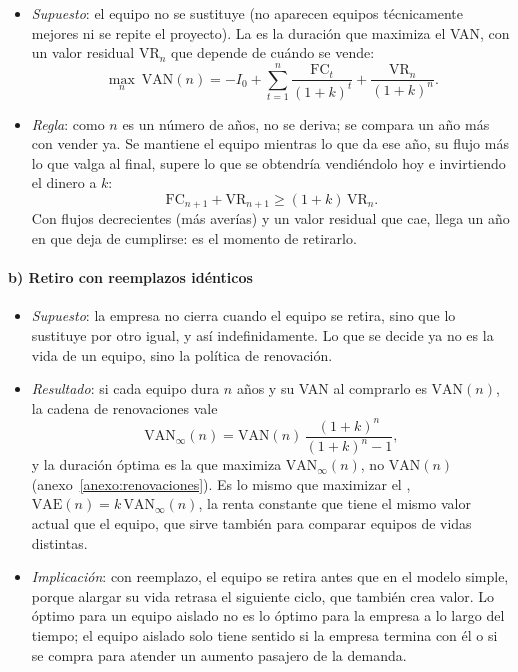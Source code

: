 \documentclass[11pt]{article}
\begin{document}
\begin{itemize}
\item \emph{Supuesto}: el equipo no se sustituye (no aparecen equipos técnicamente mejores ni se repite el proyecto). La  es la duración que maximiza el VAN, con un valor residual $\mathrm{VR}_n$ que depende de cuándo se vende:
  \[
  \max_{n}\ \mathrm{VAN}(n)=-I_0+\sum_{t=1}^{n}\frac{\mathrm{FC}_t}{(1+k)^t}+\frac{\mathrm{VR}_n}{(1+k)^n}.
  \]
\item \emph{Regla}: como $n$ es un número de años, no se deriva; se compara un año más con vender ya. Se mantiene el equipo mientras lo que da ese año, su flujo más lo que valga al final, supere lo que se obtendría vendiéndolo hoy e invirtiendo el dinero a $k$:
  \[
  \mathrm{FC}_{n+1}+\mathrm{VR}_{n+1}\geq(1+k)\,\mathrm{VR}_n.
  \]
  Con flujos decrecientes (más averías) y un valor residual que cae, llega un año en que deja de cumplirse: es el momento de retirarlo.
\end{itemize}

\paragraph{b) Retiro con reemplazos idénticos}

\begin{itemize}
\item \emph{Supuesto}: la empresa no cierra cuando el equipo se retira, sino que lo sustituye por otro igual, y así indefinidamente. Lo que se decide ya no es la vida de un equipo, sino la política de renovación.
\item \emph{Resultado}: si cada equipo dura $n$ años y su VAN al comprarlo es $\mathrm{VAN}(n)$, la cadena de renovaciones vale
  \[
  \mathrm{VAN}_\infty(n)=\mathrm{VAN}(n)\,\frac{(1+k)^n}{(1+k)^n-1},
  \]
  y la duración óptima es la que maximiza $\mathrm{VAN}_\infty(n)$, no $\mathrm{VAN}(n)$ (anexo~\ref{anexo:renovaciones}). Es lo mismo que maximizar el , $\mathrm{VAE}(n)=k\,\mathrm{VAN}_\infty(n)$, la renta constante que tiene el mismo valor actual que el equipo, que sirve también para comparar equipos de vidas distintas\nocite{BrealeyMyersAllen2020Principles}.
\item \emph{Implicación}: con reemplazo, el equipo se retira antes que en el modelo simple, porque alargar su vida retrasa el siguiente ciclo, que también crea valor. Lo óptimo para un equipo aislado no es lo óptimo para la empresa a lo largo del tiempo; el equipo aislado solo tiene sentido si la empresa termina con él o si se compra para atender un aumento pasajero de la demanda\nocite{SuarezSuarez2014Decisiones}.
\end{itemize}
\end{document}
